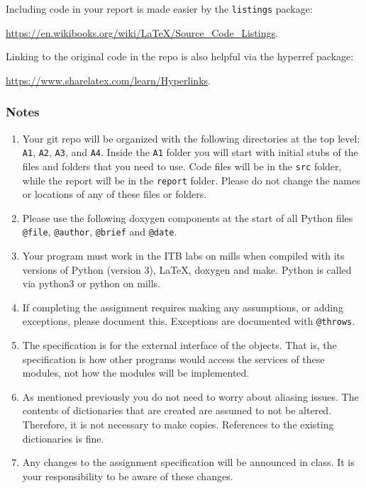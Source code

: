 \documentclass[12pt]{article}
\newcommand{\latex}{\LaTeX\xspace}
\begin{document}
Including code in your report is made easier by the \texttt{listings} package:

\noindent \href{https://en.wikibooks.org/wiki/LaTeX/Source_Code_Listings}
{https://en.wikibooks.org/wiki/LaTeX/Source\_Code\_Listings}.

Linking to the original code in the repo is also helpful via the hyperref package:

\noindent \href{https://www.sharelatex.com/learn/Hyperlinks}{https://www.sharelatex.com/learn/Hyperlinks}.

\subsubsection*{Notes}

\begin{enumerate}
\item Your git repo will be organized with the following directories at the top
  level: {\tt A1}, {\tt A2}, {\tt A3}, and {\tt A4}.  Inside the {\tt A1} folder
  you will start with initial stubs of the files and folders that you need to
  use.  Code files will be in the \texttt{src} folder, while the report will be
  in the \texttt{report} folder.  Please do not change the names or locations of
  any of these files or folders.
\item Please use the following doxygen components at the start of all Python
  files \texttt{@file}, \texttt{@author}, \texttt{@brief} and \texttt{@date}.
\item Your program must work in the ITB labs on mills when compiled with its
  versions of Python (version 3), \latex, doxygen and make.  Python is called via
  python3 or python on mills.
\item If completing the assignment requires making any assumptions, or adding
  exceptions, please document this.  Exceptions are documented with
  \texttt{@throws}.
\item The specification is for the external interface of the objects.  That is,
  the specification is how other programs would access the services of these
  modules, not how the modules will be implemented.
\item As mentioned previously you do not need to worry about aliasing issues.
  The contents of dictionaries that are created are assumed to not be altered.
  Therefore, it is not necessary to make copies.  References to the existing
  dictionaries is fine.
\item Any changes to the assignment specification will be announced in class.
  It is your responsibility to be aware of these changes.
\end{enumerate}
\end{document}
